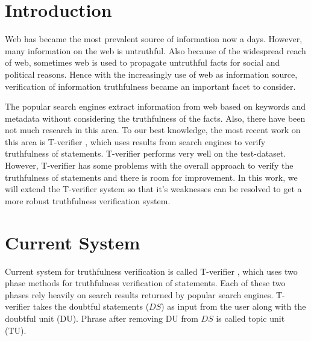 \documentclass[11pt]{article}
\begin{document}


\section{Introduction}
Web has became the most prevalent source of information now a days. However, many
information on the web is untruthful. Also because of the widespread reach of
web, sometimes web is used to propagate untruthful facts for social and political
reasons. Hence with the increasingly use of web as information source,
verification of information truthfulness became an important facet to consider.

The popular search engines extract information from web based on keywords and
metadata without considering the truthfulness of the facts. Also, there have been
not much research in this area. To our best knowledge, the most recent work on this area is T-verifier  \cite{tverifier}, which uses results from search engines
to verify truthfulness of statements. T-verifier performs very well on the
test-dataset. However, T-verifier has some problems with the overall approach to
verify the truthfulness of statements and there is room for improvement. In this
work, we will extend the T-verifier system so that it's weaknesses can be
resolved to get a more robust truthfulness verification system.


\section{Current System}
Current system for truthfulness verification is called T-verifier
\cite{tverifier}, which uses two phase methods for truthfulness verification of
statements. Each of these two phases rely heavily on search results returned by
popular search engines. T-verifier takes the doubtful statements ($DS$) as input
from the user along with the doubtful unit (DU). Phrase after removing DU from $DS$
is called topic unit (TU).
\end{document}
